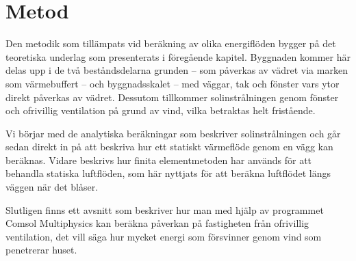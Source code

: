\chapter{Metod}

Den metodik som tillämpats vid beräkning av olika energiflöden bygger på det teoretiska underlag som presenterats i föregående kapitel. Byggnaden kommer här delas upp i de två beståndsdelarna grunden – som påverkas av vädret via marken som värmebuffert – och byggnadsskalet – med väggar, tak och fönster vars ytor direkt påverkas av vädret. Dessutom tillkommer solinstrålningen genom fönster och ofrivillig ventilation på grund av vind, vilka betraktas helt fristående.

Vi börjar med de analytiska beräkningar som beskriver solinstrålningen och går sedan direkt in på att beskriva hur ett statiskt värmeflöde genom en vägg kan beräknas. Vidare beskrivs hur finita elementmetoden har används för att behandla statiska luftflöden, som här nyttjats för att beräkna luftflödet längs väggen när det blåser.

Slutligen finns ett avsnitt som beskriver hur man med hjälp av programmet Comsol Multiphysics kan beräkna påverkan på fastigheten från ofrivillig ventilation, det vill säga hur mycket energi som försvinner genom vind som penetrerar huset. 








